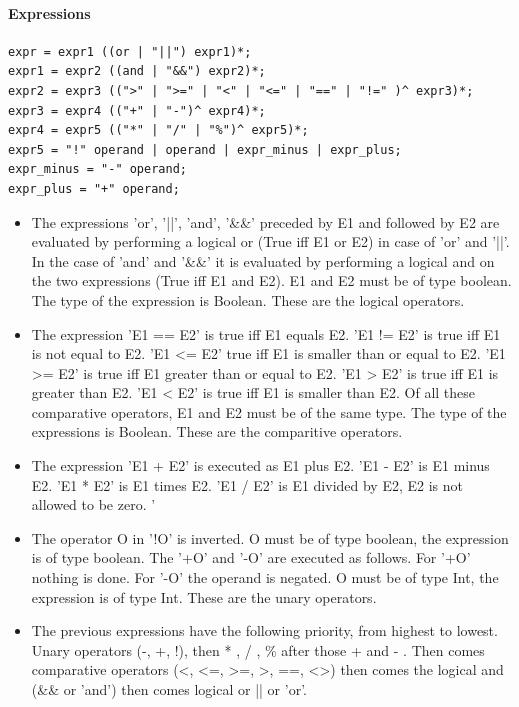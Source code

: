 \documentclass[paper=a4, fontsize=11pt]{article}
\numberwithin{equation}{section}		%
\numberwithin{figure}{section}			%
\numberwithin{table}{section}				%
\begin{document}
\paragraph{Expressions}
\begin{verbatim}
expr = expr1 ((or | "||") expr1)*;
expr1 = expr2 ((and | "&&") expr2)*;
expr2 = expr3 ((">" | ">=" | "<" | "<=" | "==" | "!=" )^ expr3)*;
expr3 = expr4 (("+" | "-")^ expr4)*;
expr4 = expr5 (("*" | "/" | "%")^ expr5)*;
expr5 = "!" operand | operand | expr_minus | expr_plus;
expr_minus = "-" operand;
expr_plus = "+" operand;
\end{verbatim}
\begin{itemize}
\item The expressions 'or', '||', 'and', '\&\&' preceded by E1 and followed by E2 are evaluated by performing a logical or (True iff E1 or E2) in case of 'or' and '||'. In the case of 'and' and '\&\&' it is evaluated by performing a logical and on the two expressions (True iff E1 and E2). E1 and E2 must be of type boolean. The type of the expression is Boolean. These are the logical operators. 
\item The expression 'E1 == E2' is true iff E1 equals E2. 'E1 != E2' is true iff E1 is not equal to E2. 'E1 <= E2' true iff E1 is smaller than or equal to E2. 'E1 >= E2' is true iff E1 greater than or equal to E2. 'E1 > E2' is true iff E1 is greater than E2. 'E1 < E2' is true iff E1 is smaller than E2. Of all these comparative operators, E1 and E2 must be of the same type. The type of the expressions is Boolean. These are the comparitive operators. 
\item The expression 'E1 + E2' is executed as E1 plus E2. 'E1 - E2' is E1 minus E2. 'E1 * E2' is E1 times E2. 'E1 / E2' is E1 divided by E2, E2 is not allowed to be zero. '%
\item The operator O in '!O' is inverted. O must be of type boolean, the expression is of type boolean. The '+O' and '-O' are executed as follows. For '+O' nothing is done. For '-O' the operand is negated. O must be of type Int, the expression is of type Int. These are the unary operators.
\item The previous expressions have the following priority, from highest to lowest. Unary operators (-, +, !), then * , / , \%  after those + and - . Then comes comparative operators (<, <=, >=, >, ==, <>) then comes the logical and (\&\& or 'and') then comes logical or || or 'or'.
\end{itemize}
\end{document}
